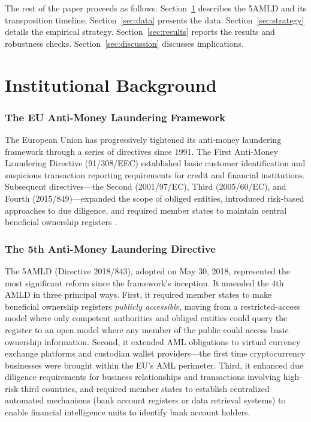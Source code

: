 \documentclass[12pt]{article}
\begin{document}
The rest of the paper proceeds as follows. Section~\ref{sec:background} describes the 5AMLD and its transposition timeline. Section~\ref{sec:data} presents the data. Section~\ref{sec:strategy} details the empirical strategy. Section~\ref{sec:results} reports the results and robustness checks. Section~\ref{sec:discussion} discusses implications.

\section{Institutional Background}
\label{sec:background}

\subsubsection*{The EU Anti-Money Laundering Framework}
The European Union has progressively tightened its anti-money laundering framework through a series of directives since 1991. The First Anti-Money Laundering Directive (91/308/EEC) established basic customer identification and suspicious transaction reporting requirements for credit and financial institutions. Subsequent directives---the Second (2001/97/EC), Third (2005/60/EC), and Fourth (2015/849)---expanded the scope of obliged entities, introduced risk-based approaches to due diligence, and required member states to maintain central beneficial ownership registers \citep{eucommission2018}.

\subsubsection*{The 5th Anti-Money Laundering Directive}
The 5AMLD (Directive 2018/843), adopted on May 30, 2018, represented the most significant reform since the framework's inception. It amended the 4th AMLD in three principal ways. First, it required member states to make beneficial ownership registers \textit{publicly accessible}, moving from a restricted-access model where only competent authorities and obliged entities could query the register to an open model where any member of the public could access basic ownership information. Second, it extended AML obligations to virtual currency exchange platforms and custodian wallet providers---the first time cryptocurrency businesses were brought within the EU's AML perimeter. Third, it enhanced due diligence requirements for business relationships and transactions involving high-risk third countries, and required member states to establish centralized automated mechanisms (bank account registers or data retrieval systems) to enable financial intelligence units to identify bank account holders.
\end{document}
